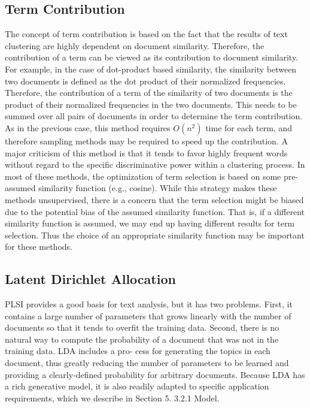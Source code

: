 \subsection{Term Contribution}
The concept of term contribution \cite{Liu2003} is based on the fact that the results of text clustering are highly dependent on document similarity. Therefore, the contribution of a term can be viewed as its contribution to document similarity. For example, in the case of dot-product based similarity, the similarity between two documents is defined as the dot product of their normalized frequencies. Therefore, the contribution of a term of the similarity of two documents is the product of their normalized frequencies in the two documents. This needs to be summed over all pairs of documents in order to determine the term contribution. As in the previous case, this method requires $O(n^2)$ time for each term, and therefore sampling methods may be required to speed up the contribution. A major criticism of this method is that it tends to favor highly frequent words without regard to the specific discriminative power within a clustering process. In most of these methods, the optimization of term selection is based on some pre-assumed similarity function (e.g., cosine). While this strategy makes these methods unsupervised, there is a concern that the term selection might be biased due to the potential bias of the assumed similarity function. That is, if a different similarity function is assumed, we may end up having different results for term selection. Thus the choice of an appropriate similarity function may be important for these methods.


\subsection{Latent Dirichlet Allocation}
PLSI provides a good basis for text analysis, but it has two problems. First, it contains a large number of parameters that grows linearly with the number of documents so that it tends to overfit the training data. Second, there is no natural way to compute the probability of a document that was not in the training data. LDA includes a pro- cess for generating the topics in each document, thus greatly reducing the number of parameters to be learned and providing a clearly-defined probability for arbitrary documents. Because LDA has a rich generative model, it is also readily adapted to specific application requirements, which we describe in Section 5.
3.2.1 Model. 

